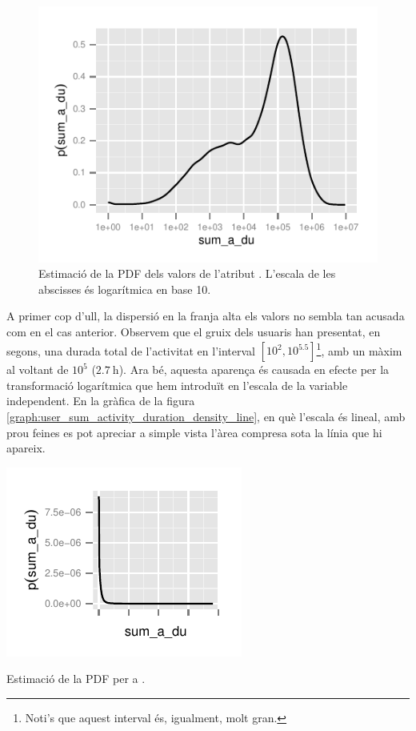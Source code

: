 \documentclass[
	a4paper,
	twoside,
	justified
]{tufte-book}
\begin{document}
\begin{figure}
\begin{center}
\includegraphics{user_sum_activity_duration_density_line_log}
\caption{
	\label{graph:user_sum_activity_duration_density_line_log}
	Estimació de la PDF dels valors de l'atribut . L'escala de les abscisses és logarítmica en base 10. 
}
\end{center}
\end{figure}

A primer cop d'ull, la dispersió en la franja alta els valors no sembla tan acusada com en el cas anterior. Observem que el gruix dels usuaris han presentat, en segons, una durada total de l'activitat en l'interval $[10^2,10^{5.5}]$\footnote{Noti's que aquest interval és, igualment, molt gran.}, amb un màxim al voltant de $10^5$ ($\SI{2.7}{\hour}$). Ara bé, aquesta aparença és causada en efecte per la transformació logarítmica que hem introduït en l'escala de la variable independent. En la gràfica de la figura \ref{graph:user_sum_activity_duration_density_line}, en què l'escala és lineal, amb prou feines es pot apreciar a simple vista l'àrea compresa sota la línia que hi apareix.   

\begin{marginfigure}
\begin{center}
\includegraphics{user_sum_activity_duration_density_line}
\caption{
	\label{graph:user_sum_activity_duration_density_line}
	Estimació de la PDF per a . 
}
\end{center}
\end{marginfigure}
\end{document}
